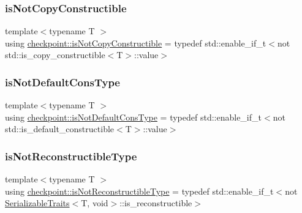 \mbox{\label{namespacecheckpoint_a141a100f9dcca06fb0b6dbf44a5d6756}} 
\subsubsection{\texorpdfstring{is\+Not\+Copy\+Constructible}{isNotCopyConstructible}}
{\footnotesize\ttfamily template$<$typename T $>$ \\
using \hyperlink{namespacecheckpoint_a141a100f9dcca06fb0b6dbf44a5d6756}{checkpoint\+::is\+Not\+Copy\+Constructible} = typedef std\+::enable\+\_\+if\+\_\+t$<$not std\+::is\+\_\+copy\+\_\+constructible$<$T$>$\+::value$>$}

\mbox{\label{namespacecheckpoint_a4032c86e7c92702198dd675a2696ee2c}} 
\subsubsection{\texorpdfstring{is\+Not\+Default\+Cons\+Type}{isNotDefaultConsType}}
{\footnotesize\ttfamily template$<$typename T $>$ \\
using \hyperlink{namespacecheckpoint_a4032c86e7c92702198dd675a2696ee2c}{checkpoint\+::is\+Not\+Default\+Cons\+Type} = typedef std\+::enable\+\_\+if\+\_\+t$<$not std\+::is\+\_\+default\+\_\+constructible$<$T$>$\+::value$>$}

\mbox{\label{namespacecheckpoint_a0054cbef71b90d6860e1d3916cf9d299}} 
\subsubsection{\texorpdfstring{is\+Not\+Reconstructible\+Type}{isNotReconstructibleType}}
{\footnotesize\ttfamily template$<$typename T $>$ \\
using \hyperlink{namespacecheckpoint_a0054cbef71b90d6860e1d3916cf9d299}{checkpoint\+::is\+Not\+Reconstructible\+Type} = typedef std\+::enable\+\_\+if\+\_\+t$<$not \hyperlink{structcheckpoint_1_1_serializable_traits}{Serializable\+Traits}$<$T, void$>$\+::is\+\_\+reconstructible$>$}

